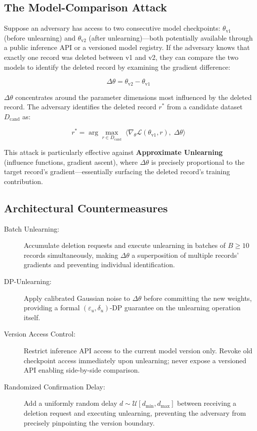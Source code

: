 \subsection{The Model-Comparison Attack}
\label{subsec:model_comparison}

Suppose an adversary has access to two consecutive model checkpoints: $\theta_{\text{v1}}$ (before unlearning) and $\theta_{\text{v2}}$ (after unlearning)---both potentially available through a public inference API or a versioned model registry. If the adversary knows that exactly one record was deleted between v1 and v2, they can compare the two models to identify the deleted record by examining the gradient difference:

\begin{equation}
\Delta\theta = \theta_{\text{v2}} - \theta_{\text{v1}}
\label{eq:unlearning_delta}
\end{equation}

$\Delta\theta$ concentrates around the parameter dimensions most influenced by the deleted record. The adversary identifies the deleted record $r^*$ from a candidate dataset $D_\mathrm{cand}$ as:

\begin{equation}
r^* = \arg\max_{r \in D_\mathrm{cand}} \; \bigl\langle \nabla_\theta \mathcal{L}(\theta_{\text{v1}}, r),\; \Delta\theta \bigr\rangle
\label{eq:unlearning_attack}
\end{equation}

This attack is particularly effective against \textbf{Approximate Unlearning} (influence functions, gradient ascent), where $\Delta\theta$ is precisely proportional to the target record's gradient---essentially surfacing the deleted record's training contribution.

\subsection{Architectural Countermeasures}
\label{subsec:unlearning_countermeasures}

\begin{description}
  \item[Batch Unlearning:] Accumulate deletion requests and execute unlearning in batches of $B \geq 10$ records simultaneously, making $\Delta\theta$ a superposition of multiple records' gradients and preventing individual identification.
  \item[DP-Unlearning:] Apply calibrated Gaussian noise to $\Delta\theta$ before committing the new weights, providing a formal $(\varepsilon_u, \delta_u)$-DP guarantee on the unlearning operation itself.
  \item[Version Access Control:] Restrict inference API access to the current model version only. Revoke old checkpoint access immediately upon unlearning; never expose a versioned API enabling side-by-side comparison.
  \item[Randomized Confirmation Delay:] Add a uniformly random delay $d \sim \mathcal{U}[d_{\min}, d_{\max}]$ between receiving a deletion request and executing unlearning, preventing the adversary from precisely pinpointing the version boundary.
\end{description}

